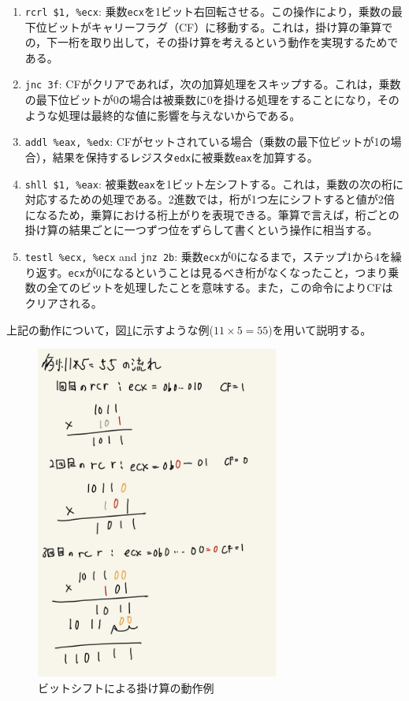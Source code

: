 \documentclass[a4paper]{jsarticle}
\newcommand{\var}[1]{\texttt{#1}}
\begin{document}
\begin{enumerate}
    \item \var{rcrl \$1, \%ecx}: 乗数\var{ecx}を1ビット右回転させる。この操作により，乗数の最下位ビットがキャリーフラグ（CF）に移動する。これは，掛け算の筆算での，下一桁を取り出して，その掛け算を考えるという動作を実現するためである。
    \item \var{jnc 3f}: CFがクリアであれば，次の加算処理をスキップする。これは，乗数の最下位ビットが0の場合は被乗数に0を掛ける処理をすることになり，そのような処理は最終的な値に影響を与えないからである。
    \item \var{addl \%eax, \%edx}: CFがセットされている場合（乗数の最下位ビットが1の場合），結果を保持するレジスタ\var{edx}に被乗数\var{eax}を加算する。
    \item \var{shll \$1, \%eax}: 被乗数\var{eax}を1ビット左シフトする。これは，乗数の次の桁に対応するための処理である。2進数では，桁が1つ左にシフトすると値が2倍になるため，乗算における桁上がりを表現できる。筆算で言えば，桁ごとの掛け算の結果ごとに一つずつ位をずらして書くという操作に相当する。
    \item \var{testl \%ecx, \%ecx} and \var{jnz 2b}: 乗数\var{ecx}が0になるまで，ステップ1から4を繰り返す。\var{ecx}が0になるということは見るべき桁がなくなったこと，つまり乗数の全てのビットを処理したことを意味する。また，この命令によりCFはクリアされる。
\end{enumerate}


上記の動作について，図\ref{fig:mul_example}に示すような例($11 \times 5 = 55$)を用いて説明する。


\begin{figure}[h]
    \centering
    \includegraphics[width=8cm]{./img-mul.jpg}
    \caption{ビットシフトによる掛け算の動作例}
    \label{fig:mul_example}
\end{figure}
\end{document}
